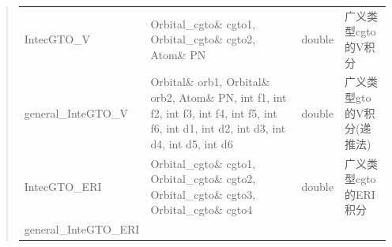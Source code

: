 \documentclass[11pt]{article}
\begin{document}
\begin{quote}
\begin{longtable}[]{@{}llll@{}}
\begin{minipage}[t]{0.17\columnwidth}\raggedright\strut
IntecGTO\_V\strut
\end{minipage} & \begin{minipage}[t]{0.37\columnwidth}\raggedright\strut
Orbital\_cgto\& cgto1, Orbital\_cgto\& cgto2, Atom\& PN\strut
\end{minipage} & \begin{minipage}[t]{0.07\columnwidth}\raggedright\strut
double\strut
\end{minipage} & \begin{minipage}[t]{0.27\columnwidth}\raggedright\strut
广义类型cgto的V积分\strut
\end{minipage}\tabularnewline
\begin{minipage}[t]{0.17\columnwidth}\raggedright\strut
general\_InteGTO\_V\strut
\end{minipage} & \begin{minipage}[t]{0.37\columnwidth}\raggedright\strut
Orbital\& orb1, Orbital\& orb2, Atom\& PN, int f1, int f2, int f3, int
f4, int f5, int f6, int d1, int d2, int d3, int d4, int d5, int d6\strut
\end{minipage} & \begin{minipage}[t]{0.07\columnwidth}\raggedright\strut
double\strut
\end{minipage} & \begin{minipage}[t]{0.27\columnwidth}\raggedright\strut
广义类型gto的V积分(递推法)\strut
\end{minipage}\tabularnewline
\begin{minipage}[t]{0.17\columnwidth}\raggedright\strut
IntecGTO\_ERI\strut
\end{minipage} & \begin{minipage}[t]{0.37\columnwidth}\raggedright\strut
Orbital\_cgto\& cgto1, Orbital\_cgto\& cgto2, Orbital\_cgto\& cgto3,
Orbital\_cgto\& cgto4\strut
\end{minipage} & \begin{minipage}[t]{0.07\columnwidth}\raggedright\strut
double\strut
\end{minipage} & \begin{minipage}[t]{0.27\columnwidth}\raggedright\strut
广义类型cgto的ERI积分\strut
\end{minipage}\tabularnewline
\begin{minipage}[t]{0.17\columnwidth}\raggedright\strut
general\_InteGTO\_ERI\strut
\end{minipage} & \begin{minipage}[t]{0.37\columnwidth}\raggedright\strut

\end{minipage}
\end{longtable}
\end{quote}
\end{document}
